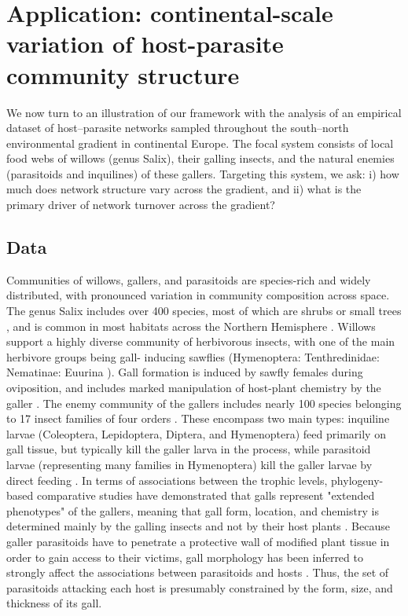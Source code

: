 \documentclass[12pt]{article}
\begin{document}

\section*{Application: continental-scale variation of host-parasite community structure}

We now turn to an illustration of our framework with the analysis of an
empirical dataset of host–parasite networks sampled throughout the south–north
environmental gradient in continental Europe. The focal system consists of
local food webs of willows (genus Salix), their galling insects, and the
natural enemies (parasitoids and inquilines) of these gallers. Targeting this
system, we ask: i) how much does network structure vary across the gradient,
and ii) what is the primary driver of network turnover across the gradient?

\subsection*{Data}

Communities of willows, gallers, and parasitoids are species-rich and widely
distributed, with pronounced variation in community composition across space.
The genus Salix includes over 400 species, most of which are shrubs or small
trees \citep{Argus1997}, and is common in most habitats across the Northern
Hemisphere \citep{Skvortsov1999}. Willows support a highly diverse community
of herbivorous insects, with one of the main herbivore groups being gall-
inducing sawflies (Hymenoptera: Tenthredinidae: Nematinae: Euurina
\citep{Kopelke1999}). Gall formation is induced by sawfly females during
oviposition, and includes marked manipulation of host-plant chemistry by the
galler \citep{Nyman2000}. The enemy community of the gallers includes nearly
100 species belonging to 17 insect families of four orders
\citep{Kopelke2003}. These encompass two main types: inquiline larvae
(Coleoptera, Lepidoptera, Diptera, and Hymenoptera) feed primarily on gall
tissue, but typically kill the galler larva in the process, while parasitoid
larvae (representing many families in Hymenoptera) kill the galler larvae by
direct feeding \citep{Kopelke2003}. In terms of associations between the
trophic levels, phylogeny-based comparative studies have demonstrated that
galls represent "extended phenotypes" of the gallers, meaning that gall form,
location, and chemistry is determined mainly by the galling insects and not by
their host plants \citep{Nyman2000}. Because galler parasitoids have to
penetrate a protective wall of modified plant tissue in order to gain access
to their victims, gall morphology has been inferred to strongly affect the
associations between parasitoids and hosts \citep{Nyman2007}. Thus, the set of
parasitoids attacking each host is presumably constrained by the form, size,
and thickness of its gall.
\end{document}
